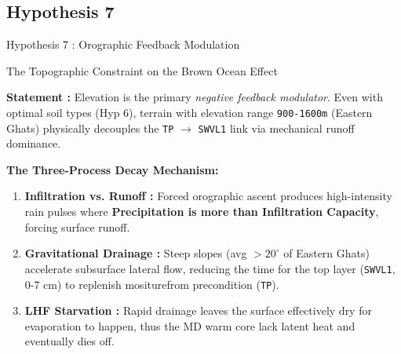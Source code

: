 \subsection{Hypothesis 7}
\begin{frame}{Hypothesis 7 : Orographic Feedback Modulation}
	\vspace{-0.2cm}
	\begin{block}{The Topographic Constraint on the Brown Ocean Effect}\end{block}

	\footnotesize
	\textbf{Statement :} Elevation is the primary \textit{negative feedback modulator}. Even with optimal soil types (Hyp 6), terrain with elevation range \texttt{900-1600m} (Eastern Ghats) physically decouples the \texttt{TP} $\rightarrow$ \texttt{SWVL1} link via mechanical runoff dominance.

	\vspace{0.15cm}
	\footnotesize
	\textbf{The Three-Process Decay Mechanism:}
	\begin{enumerate} \footnotesize
		\item \textbf{Infiltration vs. Runoff :} Forced orographic ascent produces high-intensity rain pulses where \textbf{Precipitation is more than Infiltration Capacity}, forcing surface runoff.
		\item \textbf{Gravitational Drainage :} Steep slopes (avg $>20^\circ$ of Eastern Ghats) accelerate subsurface lateral flow, reducing the time for the top layer (\texttt{SWVL1}, 0-7 cm) to replenish mositurefrom precondition (\texttt{TP}).
		\item \textbf{LHF Starvation :} Rapid drainage leaves the surface effectively dry for evaporation to happen, thus the MD warm core lack latent heat and eventually dies off.
	\end{enumerate}


\end{frame}
